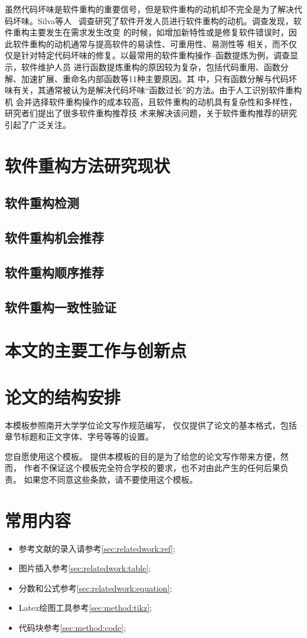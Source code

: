 虽然代码坏味是软件重构的重要信号，但是软件重构的动机却不完全是为了解决代码坏味。Silva等人
~\cite{Silva2016}调查研究了软件开发人员进行软件重构的动机。调查发现，软件重构主要发生在需求发生改变
的时候，如增加新特性或是修复软件错误时，因此软件重构的动机通常与提高软件的易读性、可重用性、易测性等
相关，而不仅仅是针对特定代码坏味的修复。以最常用的软件重构操作--函数提炼为例，调查显示，软件维护人员
进行函数提炼重构的原因较为复杂，包括代码重用、函数分解、加速扩展、重命名内部函数等11种主要原因。其
中，只有函数分解与代码坏味有关，其通常被认为是解决代码坏味``函数过长''的方法。由于人工识别软件重构机
会并选择软件重构操作的成本较高，且软件重构的动机具有复杂性和多样性，研究者们提出了很多软件重构推荐技
术来解决该问题，关于软件重构推荐的研究引起了广泛关注。


\section{软件重构方法研究现状}
\subsection{软件重构检测}
\subsection{软件重构机会推荐}
\subsection{软件重构顺序推荐}
\subsection{软件重构一致性验证}

\section{本文的主要工作与创新点}

\section{论文的结构安排}

本模板参照南开大学学位论文写作规范编写，
仅仅提供了论文的基本格式，包括章节标题和正文字体、字号等等的设置。



您自愿使用这个模板。
提供本模板的目的是为了给您的论文写作带来方便，然而，
作者不保证这个模板完全符合学校的要求，也不对由此产生的任何后果负责。
如果您不同意这些条款，请不要使用这个模板。


\section{常用内容}

\begin{itemize}
	\item 参考文献的录入请参考\ref{sec:relatedwork:ref};
	\item 图片插入参考\ref{sec:relatedwork:table};
	\item 分数和公式参考\ref{sec:relatedwork:equation};
	\item Latex绘图工具参考\ref{sec:method:tikz};
	\item 代码块参考\ref{sec:method:code};
\end{itemize}